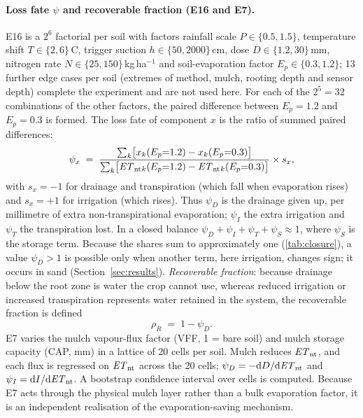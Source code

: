 \paragraph{Loss fate $\psi$ and recoverable fraction (E16 and E7).}
E16 is a $2^6$ factorial per soil with factors rainfall scale $P\in\{0.5,1.5\}$, temperature shift $T\in\{2,6\}$\,\textdegree C, trigger suction $h\in\{50,2000\}$\,cm, dose $D\in\{1.2,30\}$\,mm, nitrogen rate $N\in\{25,150\}$\,kg\,ha$^{-1}$ and soil-evaporation factor $E_p\in\{0.3,1.2\}$; 13 further edge cases per soil (extremes of method, mulch, rooting depth and sensor depth) complete the experiment and are not used here. For each of the $2^5=32$ combinations of the other factors, the paired difference between $E_p=1.2$ and $E_p=0.3$ is formed. The loss fate of component $x$ is the ratio of summed paired differences:
\begin{equation}
\psi_x \;=\; \frac{\sum_{k}\bigl[x_k(E_p{=}1.2)-x_k(E_p{=}0.3)\bigr]}{\sum_{k}\bigl[\mathit{ET}_{\mathrm{nt}}{}_k(E_p{=}1.2)-\mathit{ET}_{\mathrm{nt}}{}_k(E_p{=}0.3)\bigr]}\times s_x,
\label{eq:psi}
\end{equation}
with $s_x=-1$ for drainage and transpiration (which fall when evaporation rises) and $s_x=+1$ for irrigation (which rises). Thus $\psi_D$ is the drainage given up, per millimetre of extra non-transpirational evaporation; $\psi_I$ the extra irrigation and $\psi_T$ the transpiration lost. In a closed balance $\psi_D+\psi_I+\psi_T+\psi_S\approx1$, where $\psi_S$ is the storage term. Because the shares sum to approximately one (\cref{tab:closure}), a value $\psi_D>1$ is possible only when another term, here irrigation, changes sign; it occurs in sand (Section~\ref{sec:results}). \emph{Recoverable fraction}: because drainage below the root zone is water the crop cannot use, whereas reduced irrigation or increased transpiration represents water retained in the system, the recoverable fraction is defined
\begin{equation}
\rho_R \;=\; 1-\psi_D .
\label{eq:rec}
\end{equation}
E7 varies the mulch vapour-flux factor (VFF, 1 = bare soil) and mulch storage capacity (CAP, mm) in a lattice of 20 cells per soil. Mulch reduces $\mathit{ET}_{\mathrm{nt}}$, and each flux is regressed on $\mathit{ET}_{\mathrm{nt}}$ across the 20 cells; $\psi_D=-\mathrm{d}D/\mathrm{d}\mathit{ET}_{\mathrm{nt}}$ and $\psi_I=\mathrm{d}I/\mathrm{d}\mathit{ET}_{\mathrm{nt}}$. A bootstrap confidence interval over cells is computed. Because E7 acts through the physical mulch layer rather than a bulk evaporation factor, it is an independent realisation of the evaporation-saving mechanism.

